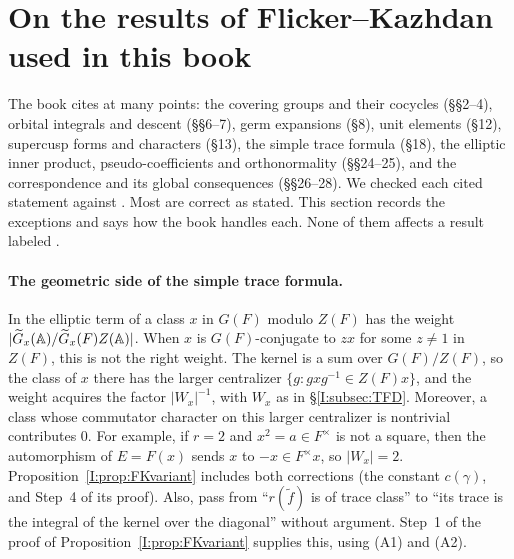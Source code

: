 \section{On the results of Flicker--Kazhdan used in this book}\label{lit:sec:FK}

The book cites \cite{FK86} at many points: the covering groups and their cocycles (\S\S2--4), orbital integrals and descent (\S\S6--7), germ expansions (\S8), unit elements (\S12), supercusp forms and characters (\S13), the simple trace formula (\S18), the elliptic inner product, pseudo-coefficients and orthonormality (\S\S24--25), and the correspondence and its global consequences (\S\S26--28). We checked each cited statement against \cite{FK86}. Most are correct as stated. This section records the exceptions and says how the book handles each. None of them affects a result labeled \Pv.

\paragraph{The geometric side of the simple trace formula.} In \cite[(18.1)]{FK86} the elliptic term of a class $x$ in $G(F)$ modulo $Z(F)$ has the weight $|\widetilde G_x(\mathbb A)/\widetilde G_x(F)Z(\mathbb A)|$. When $x$ is $G(F)$-conjugate to $zx$ for some $z\ne1$ in $Z(F)$, this is not the right weight. The kernel is a sum over $G(F)/Z(F)$, so the class of $x$ there has the larger centralizer $\{g:gxg^{-1}\in Z(F)x\}$, and the weight acquires the factor $|W_x|^{-1}$, with $W_x$ as in \S\ref{I:subsec:TFD}. Moreover, a class whose commutator character on this larger centralizer is nontrivial contributes $0$. For example, if $r=2$ and $x^2=a\in F^\times$ is not a square, then the automorphism of $E=F(x)$ sends $x$ to $-x\in F^\times x$, so $|W_x|=2$. Proposition~\ref{I:prop:FKvariant} includes both corrections (the constant $c(\gamma)$, and Step~4 of its proof). Also, \cite[\S18]{FK86} pass from ``$r(\tilde f)$ is of trace class'' to ``its trace is the integral of the kernel over the diagonal'' without argument. Step~1 of the proof of Proposition~\ref{I:prop:FKvariant} supplies this, using (A1) and (A2).

